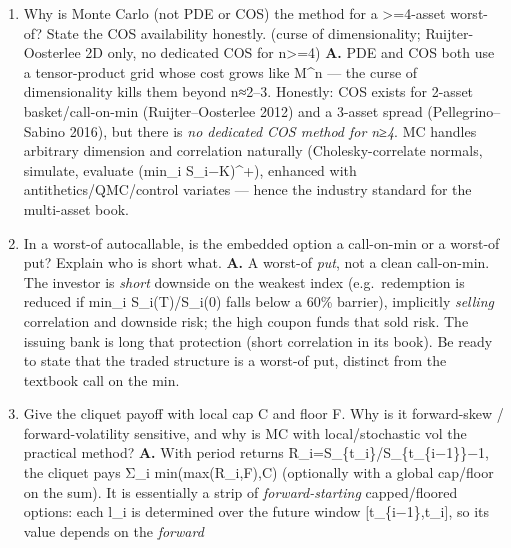 \documentclass[
  11pt,
]{article}
\begin{document}
\begin{enumerate}
  call: (min\_i S\_i(T)−K)\^{}+. For B\_T=Σ\_i w\_i S\_i(T),
  Var(B\_T)=Σ\_iΣ\_j w\_i w\_j Cov(S\_i,S\_j)=Σ\_i
  w\_i²Var(S\_i)+Σ\_\{i≠j\}w\_i w\_j ρ\_\{ij\}√(Var S\_i·Var S\_j). The
  off-diagonal ρ\_\{ij\} terms drive the variance: positively correlated
  baskets are more volatile (dearer), weakly/negatively correlated ones
  diversify. A worst-of is even more correlation-sensitive (ρ→1 makes it
  a single-asset option; low ρ drags the minimum down). The 2008
  correlation break-down is what made these books dangerous.
\item
  Why is Monte Carlo (not PDE or COS) the method for a
  \textgreater=4-asset worst-of? State the COS availability honestly.
  (curse of dimensionality; Ruijter-Oosterlee 2D only, no dedicated COS
  for n\textgreater=4) \textbf{A.} PDE and COS both use a tensor-product
  grid whose cost grows like M\^{}n --- the curse of dimensionality
  kills them beyond n≈2--3. Honestly: COS exists for 2-asset
  basket/call-on-min (Ruijter--Oosterlee 2012) and a 3-asset spread
  (Pellegrino--Sabino 2016), but there is \emph{no dedicated COS method
  for n≥4}. MC handles arbitrary dimension and correlation naturally
  (Cholesky-correlate normals, simulate, evaluate (min\_i S\_i−K)\^{}+),
  enhanced with antithetics/QMC/control variates --- hence the industry
  standard for the multi-asset book.
\item
  In a worst-of autocallable, is the embedded option a call-on-min or a
  worst-of put? Explain who is short what. \textbf{A.} A worst-of
  \emph{put}, not a clean call-on-min. The investor is \emph{short}
  downside on the weakest index (e.g.~redemption is reduced if min\_i
  S\_i(T)/S\_i(0) falls below a 60\% barrier), implicitly \emph{selling}
  correlation and downside risk; the high coupon funds that sold risk.
  The issuing bank is long that protection (short correlation in its
  book). Be ready to state that the traded structure is a worst-of put,
  distinct from the textbook call on the min.
\item
  Give the cliquet payoff with local cap C and floor F. Why is it
  forward-skew / forward-volatility sensitive, and why is MC with
  local/stochastic vol the practical method? \textbf{A.} With period
  returns R\_i=S\_\{t\_i\}/S\_\{t\_\{i−1\}\}−1, the cliquet pays Σ\_i
  min(max(R\_i,F),C) (optionally with a global cap/floor on the sum). It
  is essentially a strip of \emph{forward-starting} capped/floored
  options: each l\_i is determined over the future window
  {[}t\_\{i−1\},t\_i{]}, so its value depends on the \emph{forward}

\end{enumerate}
\end{document}
